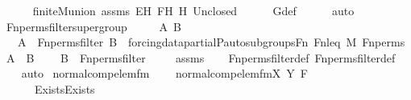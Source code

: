 \begin{isabellebody}
\ \ \ \ \isamarkupfalse%
\ finite{\isacharunderscore}{\kern0pt}M{\isacharunderscore}{\kern0pt}union\ assms\ EH\ FH\ H\ Un{\isacharunderscore}{\kern0pt}closed\isanewline
\ \ \ \ \isamarkupfalse%
\ G{\isacharunderscore}{\kern0pt}def\isanewline
\ \ \ \ \isamarkupfalse%
\ auto\isanewline
{}\isamarkupfalse%
%
\endisatagproof
{\isafoldproof}%
%
\isadelimproof
\isanewline
%
\endisadelimproof
\isanewline
{}\isamarkupfalse%
\ Fn{\isacharunderscore}{\kern0pt}perms{\isacharunderscore}{\kern0pt}filter{\isacharunderscore}{\kern0pt}supergroup\ {\isacharcolon}{\kern0pt}\ \isanewline
\ \ \ A\ B\isanewline
\ \ \ {\isachardoublequoteopen}A\ {\isasymin}\ Fn{\isacharunderscore}{\kern0pt}perms{\isacharunderscore}{\kern0pt}filter{\isachardoublequoteclose}\ {\isachardoublequoteopen}B\ {\isasymin}\ forcing{\isacharunderscore}{\kern0pt}data{\isacharunderscore}{\kern0pt}partial{\isachardot}{\kern0pt}P{\isacharunderscore}{\kern0pt}auto{\isacharunderscore}{\kern0pt}subgroups{\isacharparenleft}{\kern0pt}Fn{\isacharcomma}{\kern0pt}\ Fn{\isacharunderscore}{\kern0pt}leq{\isacharcomma}{\kern0pt}\ M{\isacharcomma}{\kern0pt}\ Fn{\isacharunderscore}{\kern0pt}perms{\isacharparenright}{\kern0pt}{\isachardoublequoteclose}\ {\isachardoublequoteopen}A\ {\isasymsubseteq}\ B{\isachardoublequoteclose}\ \isanewline
\ \ \ {\isachardoublequoteopen}B\ {\isasymin}\ Fn{\isacharunderscore}{\kern0pt}perms{\isacharunderscore}{\kern0pt}filter{\isachardoublequoteclose}\ \isanewline
%
\isadelimproof
\ \ %
\endisadelimproof
%
\isatagproof
{}\isamarkupfalse%
\ assms\isanewline
\ \ \isamarkupfalse%
\ Fn{\isacharunderscore}{\kern0pt}perms{\isacharunderscore}{\kern0pt}filter{\isacharunderscore}{\kern0pt}def\ Fn{\isacharunderscore}{\kern0pt}perms{\isacharunderscore}{\kern0pt}filter{\isacharunderscore}{\kern0pt}def\isanewline
\ \ \isamarkupfalse%
\ auto%
\endisatagproof
{\isafoldproof}%
%
\isadelimproof
\isanewline
%
\endisadelimproof
\isanewline
{}\isamarkupfalse%
\ normal{\isacharunderscore}{\kern0pt}comp{\isacharunderscore}{\kern0pt}elem{\isacharunderscore}{\kern0pt}fm\ \ \isanewline
\ \ {\isachardoublequoteopen}normal{\isacharunderscore}{\kern0pt}comp{\isacharunderscore}{\kern0pt}elem{\isacharunderscore}{\kern0pt}fm{\isacharparenleft}{\kern0pt}X{\isacharcomma}{\kern0pt}\ Y{\isacharcomma}{\kern0pt}\ F{\isacharparenright}{\kern0pt}\ {\isasymequiv}\ \isanewline
\ \ \ \ \ \ Exists{\isacharparenleft}{\kern0pt}Exists{\isacharparenleft}{\kern0pt}\isanewline

\end{isabellebody}

